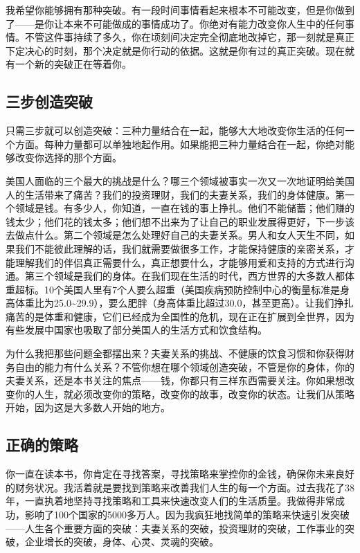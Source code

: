 我希望你能够拥有那种突破。有一段时间事情看起来根本不可能改变，但是你做到了——是你让本来不可能做成的事情成功了。你绝对有能力改变你人生中的任何事情。不管这件事持续了多久，你在顷刻间决定完全彻底地改掉它，那一刻就是真正下定决心的时刻，那个决定就是你行动的依据。这就是你有过的真正突破。现在就有一个新的突破正在等着你。

\subsection{三步创造突破}

只需三步就可以创造突破：三种力量结合在一起，能够大大地改变你生活的任何一个方面。每种力量都可以单独地起作用。如果能把三种力量结合在一起，你绝对能够改变你选择的那个方面。

美国人面临的三个最大的挑战是什么？哪三个领域被事实一次又一次地证明给美国人的生活带来了痛苦？我们的投资理财，我们的夫妻关系，我们的身体健康。第一个领域是钱。有多少人，你知道，一直在钱的事上挣扎。他们不能储蓄；他们赚的钱太少；他们花的钱太多；他们想不出来为了让自己的职业发展得更好，下一步该去做点什么。第二个领域是怎么处理好自己的夫妻关系。男人和女人天生不同，如果我们不能彼此理解的话，我们就需要做很多工作，才能保持健康的亲密关系，才能理解我们的伴侣真正需要什么，真正想要什么，才能够用爱和支持的方式进行沟通。第三个领域是我们的身体。在我们现在生活的时代，西方世界的大多数人都体重超标。10个美国人里有7个人要么超重（美国疾病预防控制中心的衡量标准是身高体重比为25.0\textasciitilde{}29.9），要么肥胖（身高体重比超过30.0，甚至更高）。让我们挣扎痛苦的是体重和健康，它们已经成为全国性的危机，现在正在扩展到全世界，因为有些发展中国家也吸取了部分美国人的生活方式和饮食结构。

为什么我把那些问题全都摆出来？夫妻关系的挑战、不健康的饮食习惯和你获得财务自由的能力有什么关系？不管你想在哪个领域创造突破，不管是你的身体，你的夫妻关系，还是本书关注的焦点——钱，你都只有三样东西需要关注。你如果想改变你的人生，就必须改变你的策略，改变你的故事，改变你的状态。让我们从策略开始，因为这是大多数人开始的地方。

\subsection{正确的策略}

你一直在读本书，你肯定在寻找答案，寻找策略来掌控你的金钱，确保你未来良好的财务状况。我活着就是要找到策略来改善我们人生的每一个方面。过去我花了38年，一直执着地坚持寻找策略和工具来快速改变人们的生活质量。我做得非常成功，影响了100个国家的5000多万人。因为我疯狂地找简单的策略来快速引发突破——人生各个重要方面的突破：夫妻关系的突破，投资理财的突破，工作事业的突破，企业增长的突破，身体、心灵、灵魂的突破。

